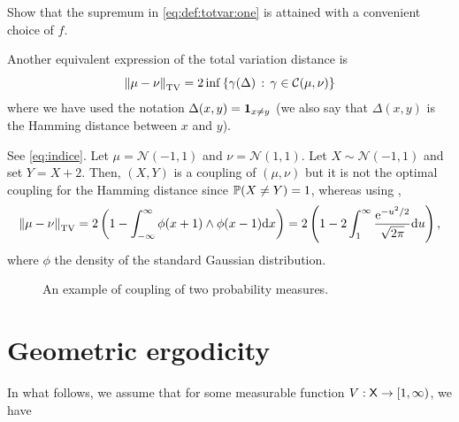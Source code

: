 \documentclass[english,graybox,envcountchap,envcountsame,sectrefs,shortlabels]{svmono}
\theoremstyle{style}
\newcommand{\rme}{\mathrm{e}}
\newcommand{\gauss}{\mathcal{N}}
\newcommand{\eqsp}{}
\begin{document}
\begin{exercise}
Show that the supremum in \eqref{eq:def:totvar:one} is attained with a convenient choice of $f$.
\end{exercise}

Another equivalent expression of the total variation distance is
\begin{equation}\label{eq:coupling}
\left\|\mu-\nu\right\|_{\mathrm{TV}}= 2\inf\left\{ \gamma(\Delta) \,:\,\gamma \in \mathcal{C}(\mu,\nu)\right\}
\end{equation}
where we have used the notation $\Delta(x,y)=\mathbf{1}_{x\neq y}$ (we also say that $\Delta(x,y)$ is the Hamming distance between $x$ and $y$).

\begin{example}
See \autoref{eq:indice}.
  Let $\mu=\gauss(-1,1)$ and $\nu=\gauss(1,1)$. Let $X\sim \gauss(-1,1)$ and set $Y=X+2$. Then,
  $(X,Y)$ is a coupling of $(\mu,\nu)$ but it is not the optimal coupling for the Hamming distance
  since $\mathbb{P}(X\neq Y) = 1$, whereas using ,
  \begin{align*}
    \tvnorm{\mu-\nu} = 2\lr{1 - \int_{-\infty}^\infty \phi(x+1)\wedge\phi(x-1) \rmd x} =2\lr{
1 -     2 \int_1^\infty \frac{\rme^{-u^2/2}}{\sqrt{2\pi}} \rmd u }\eqsp ,
  \end{align*}
  where $\phi$ the density of the standard Gaussian distribution.

\begin{figure}[!h]
\begin{center}
\end{center}

\caption{An example of coupling of two probability measures.}
\label{eq:indice}
\end{figure}

\end{example}
\section{Geometric ergodicity}
In what follows, we assume that for some measurable function $V:\mathsf{X} \to [1,\infty)$, we have
\end{document}
